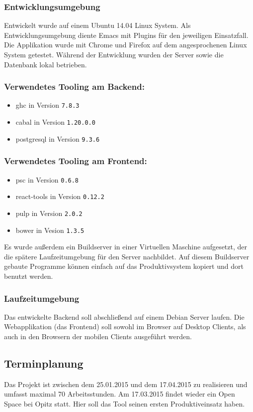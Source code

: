 \subsubsection{Entwicklungsumgebung}
Entwickelt wurde auf einem Ubuntu 14.04 Linux System. Als
Entwicklungsumgebung diente Emacs mit Plugins für den jeweiligen
Einsatzfall. Die Applikation wurde mit Chrome und Firefox auf dem
angesprochenen Linux System getestet. Während der Entwicklung wurden
der Server sowie die Datenbank lokal betrieben.
\subsubsection*{Verwendetes Tooling am Backend:}
\begin{itemize}
\item \gls{ghc} in Version \texttt{7.8.3}
\item \gls{cabal} in Version \texttt{1.20.0.0}
\item \gls{postgresql} in Version \texttt{9.3.6}
\end{itemize}

\subsubsection*{Verwendetes Tooling am Frontend:}
\begin{itemize}
\item \gls{psc} in Version \texttt{0.6.8}
\item \gls{react-tools} in Version \texttt{0.12.2}
\item \gls{pulp} in Version \texttt{2.0.2}
\item \gls{bower} in Vesion \texttt{1.3.5}
\end{itemize}
Es wurde außerdem ein Buildserver in einer Virtuellen Maschine
aufgesetzt, der die spätere Laufzeitumgebung für den Server
nachbildet. Auf diesem Buildserver gebaute Programme können einfach
auf das Produktivsystem kopiert und dort benutzt werden.
\subsubsection{Laufzeitumgebung}
Das entwickelte Backend soll abschließend auf einem Debian Server
laufen. Die Webapplikation (das Frontend) soll sowohl im Browser auf
Desktop Clients, als auch in den Browsern der mobilen Clients
ausgeführt werden.
\subsection{Terminplanung}
Das Projekt ist zwischen dem 25.01.2015 und dem 17.04.2015 zu
realisieren und umfasst maximal 70 Arbeitsstunden. Am 17.03.2015
findet wieder ein Open Space bei Opitz statt. Hier soll das Tool
seinen ersten Produktiveinsatz haben.

